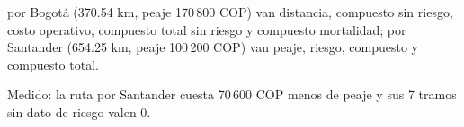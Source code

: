 {\raggedright por Bogotá (370.54 km, peaje 170\,800 COP) van distancia, compuesto sin riesgo, costo operativo, compuesto total sin riesgo y compuesto mortalidad; por Santander (654.25 km, peaje 100\,200 COP) van peaje, riesgo, compuesto y compuesto total.}
{Medido: la ruta por Santander cuesta 70\,600 COP menos de peaje y sus 7 tramos sin dato de riesgo valen 0.}
